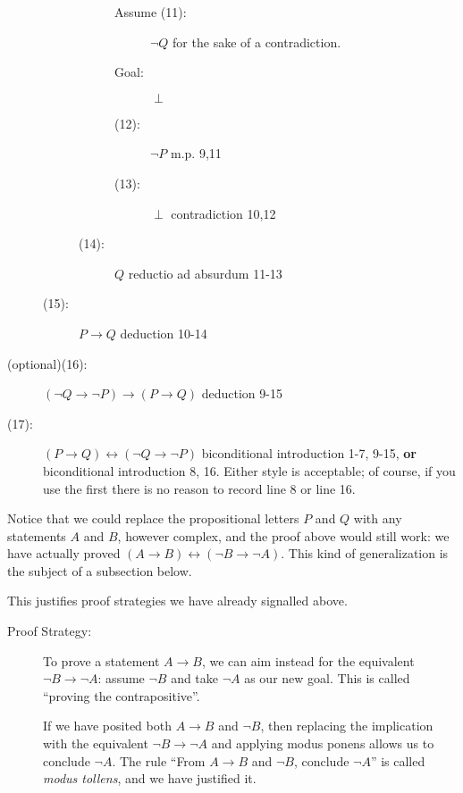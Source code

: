 \documentclass[12pt]{book}
\begin{document}
\begin{description}
\begin{description}
\begin{description}
\begin{description}

\item[Assume (11):] $\neg Q$ for the sake of a contradiction.

\item[Goal:]  $\perp$

\item[(12):]  $\neg P$  m.p. 9,11

\item[(13):]  $\perp$ contradiction 10,12

\end{description}

\item[(14):]  $Q$ reductio ad absurdum 11-13

\end{description}

\item[(15):]  $P \rightarrow Q$ deduction 10-14

\end{description}

\item[(optional)(16):]  $(\neg Q \rightarrow \neg P) \rightarrow (P \rightarrow Q)$  deduction 9-15

\item[(17):] $(P \rightarrow Q) \leftrightarrow (\neg Q \rightarrow \neg P)$ biconditional introduction 1-7, 9-15, {\bf or} biconditional introduction 8, 16.  Either style is acceptable; of course, if you use the first there is no reason to record line 8 or line 16.

\end{description}

Notice that we could replace the propositional letters $P$ and $Q$
with any statements $A$ and $B$, however complex, and the proof above
would still work: we have actually proved $(A \rightarrow B) \leftrightarrow
(\neg B \rightarrow \neg A)$.  This kind of generalization is the
subject of a subsection below.

This justifies proof strategies we have already signalled above.

\begin{description}

\item[Proof Strategy:]

To prove a statement $A \rightarrow B$, we can aim instead for the
equivalent $\neg B \rightarrow \neg A$: assume $\neg B$ and take $\neg
A$ as our new goal.  This is called ``proving the contrapositive''.

If we have posited both $A \rightarrow B$ and $\neg B$, then replacing
the implication with the equivalent $\neg B \rightarrow \neg A$ and
applying modus ponens allows us to conclude $\neg A$.  The rule ``From
$A \rightarrow B$ and $\neg B$, conclude $\neg A$'' is called {\em
modus tollens\/}, and we have justified it.

\end{description}
\end{document}
